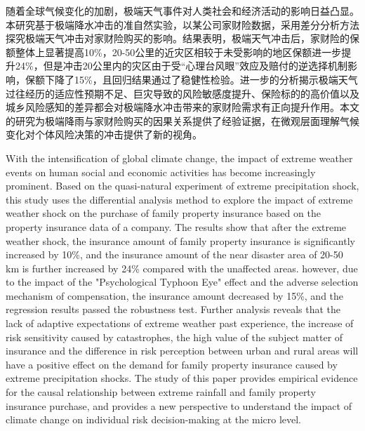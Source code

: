 \begin{cabstract}
    随着全球气候变化的加剧，极端天气事件对人类社会和经济活动的影响日益凸显。本研究基于极端降水冲击的准自然实验，以某公司家财险数据，采用差分分析方法探究极端天气冲击对家财险购买的影响。结果表明，极端天气冲击后，家财险的保额整体上显著提高10\%，20-50公里的近灾区相较于未受影响的地区保额进一步提升24\%，但是冲击20公里内的灾区由于受“心理台风眼”效应及赔付的逆选择机制影响，保额下降了15\%，且回归结果通过了稳健性检验。进一步的分析揭示极端天气过往经历的适应性预期不足、巨灾导致的风险敏感度提升、保险标的的高价值以及城乡风险感知的差异都会对极端降水冲击带来的家财险需求有正向提升作用。本文的研究为极端降雨与家财险购买的因果关系提供了经验证据，在微观层面理解气候变化对个体风险决策的冲击提供了新的视角。
\end{cabstract}
\begin{eabstract}
    With the intensification of global climate change, the impact of extreme weather events on human social and economic activities has become increasingly prominent. Based on the quasi-natural experiment of extreme precipitation shock, this study uses the differential analysis method to explore the impact of extreme weather shock on the purchase of family property insurance based on the property insurance data of a company. The results show that after the extreme weather shock, the insurance amount of family property insurance is significantly increased by 10\%, and the insurance amount of the near disaster area of 20-50 km is further increased by 24\% compared with the unaffected areas. however, due to the impact of the "Psychological Typhoon Eye" effect and the adverse selection mechanism of compensation, the insurance amount decreased by 15\%, and the regression results passed the robustness test. Further analysis reveals that the lack of adaptive expectations of extreme weather past experience, the increase of risk sensitivity caused by catastrophes, the high value of the subject matter of insurance and the difference in risk perception between urban and rural areas will have a positive effect on the demand for family property insurance caused by extreme precipitation shocks. The study of this paper provides empirical evidence for the causal relationship between extreme rainfall and family property insurance purchase, and provides a new perspective to understand the impact of climate change on individual risk decision-making at the micro level.
\end{eabstract}

